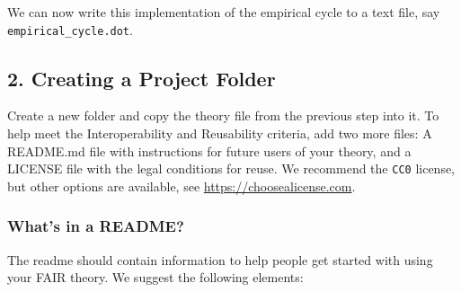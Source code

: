 \documentclass[
  man,floatsintext]{apa6}
\begin{document}
We can now write this implementation of the empirical cycle to a text file, say \texttt{empirical\_cycle.dot}.

\subsection{2. Creating a Project Folder}\label{creating-a-project-folder}

Create a new folder and copy the theory file from the previous step into it.
To help meet the Interoperability and Reusability criteria,
add two more files:
A README.md file with instructions for future users of your theory,
and a LICENSE file with the legal conditions for reuse.
We recommend the \texttt{CC0} license, but other options are available, see \href{https://choosealicense.com/non-software/}{https://choosealicense.com}.

\subsubsection{What's in a README?}\label{whats-in-a-readme}

The readme should contain information to help people get started with using your FAIR theory.
We suggest the following elements:
\end{document}
